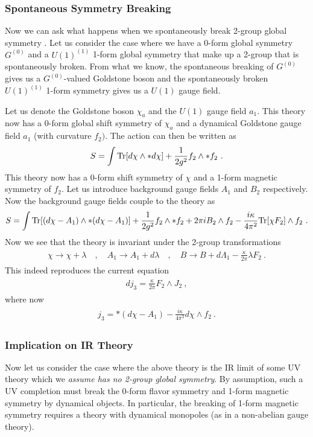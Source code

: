 \documentclass[11pt]{article}
\newcommand{\eq}[1]{\begin{align}\begin{split}#1\end{split}\end{align}}
\newcommand{\twopi}[1]{{\frac{#1}{2\pi}}}
\def\Tr{{\rm Tr}}
\begin{document}
 

\subsubsection{Spontaneous Symmetry Breaking}

Now we can ask what happens when we spontaneously break 2-group global symmetry \cite{Cordova:2018cvg}. Let us consider the case where we have a 0-form global symmetry $G^{(0)}$ and a $U(1)^{(1)}$ 1-form global symmetry that make up a 2-group that is spontaneously broken. From what we know, the spontaneous breaking of $G^{(0)}$ gives us a $G^{(0)}$-valued Goldstone boson and the spontaneously broken $U(1)^{(1)}$ 1-form symmetry gives us a $U(1)$ gauge field. 

Let us denote the Goldstone boson $\chi_a$ and the $U(1)$ gauge field $a_1$. This theory now has a 0-form global shift symmetry of $\chi_a$ and a dynamical Goldstone gauge field $a_1$ (with curvature $f_2)$. The action can then be written as 
\eq{
S=\int \Tr[d\chi\wedge \ast d\chi]+\frac{1}{2g^2}f_2\wedge \ast f_2~.
}
This theory now has a 0-form shift symmetry of $\chi$ and a 1-form magnetic symmetry of $f_2$. Let us introduce background gauge fields $A_1$ and $B_2$ respectively. Now the background gauge fields couple to the theory as 
\eq{
S=\int \Tr[(d\chi-A_1)\wedge \ast(d \chi -A_1)]+\frac{1}{2g^2}f_2\wedge \ast f_2+2\pi i B_2\wedge f_2-\frac{i \kappa}{4\pi^2} \Tr[\chi F_2]\wedge f_2~. 
}
Now we see that the theory is invariant under the 2-group transformations 
\eq{
\chi\to \chi+\lambda \quad, \quad A_1\to A_1+d\lambda\quad, \quad B\to B+d\Lambda_1-\twopi{\kappa} \lambda F_2~.
}
This indeed reproduces the current equation 
\eq{
d j_3=\twopi\kappa F_2\wedge J_2~,
}
where now 
\eq{
j_3=\ast (d\chi-A_1)-\frac{i \kappa}{4\pi^2} d\chi \wedge f_2~. 
}


\subsubsection{Implication on IR Theory}

Now let us consider the case where the above theory is the IR limit of some UV theory which we \emph{assume has no 2-group global symmetry}. By assumption, such a UV completion must break the 0-form flavor symmetry and 1-form magnetic symmetry by dynamical objects. In particular, the breaking of 1-form magnetic symmetry requires a theory with dynamical monopoles (as in a non-abelian gauge theory). 
\end{document}
